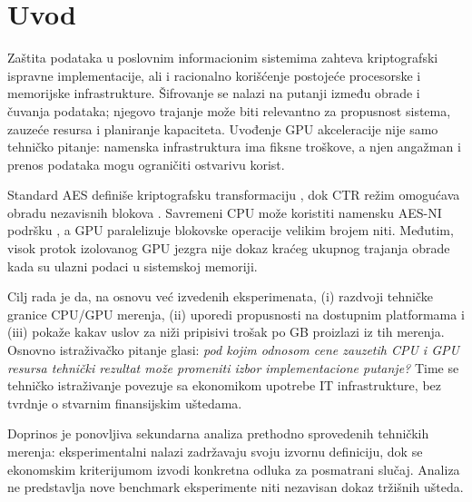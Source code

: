 \documentclass[11pt,b5paper]{article}
\begin{document}
\section{Uvod}
Zaštita podataka u poslovnim informacionim sistemima zahteva kriptografski ispravne implementacije, ali i racionalno korišćenje postojeće procesorske i memorijske infrastrukture. Šifrovanje se nalazi na putanji između obrade i čuvanja podataka; njegovo trajanje može biti relevantno za propusnost sistema, zauzeće resursa i planiranje kapaciteta. Uvođenje GPU akceleracije nije samo tehničko pitanje: namenska infrastruktura ima fiksne troškove, a njen angažman i prenos podataka mogu ograničiti ostvarivu korist.\par
Standard AES definiše kriptografsku transformaciju \citep{nist_aes2023}, dok CTR režim omogućava obradu nezavisnih blokova \citep{nist_ctr2001}. Savremeni CPU može koristiti namensku AES-NI podršku \citep{intel_aesni}, a GPU paralelizuje blokovske operacije velikim brojem niti. Međutim, visok protok izolovanog GPU jezgra nije dokaz kraćeg ukupnog trajanja obrade kada su ulazni podaci u sistemskoj memoriji.\par
Cilj rada je da, na osnovu već izvedenih eksperimenata, (i) razdvoji tehničke granice CPU/GPU merenja, (ii) uporedi propusnosti na dostupnim platformama i (iii) pokaže kakav uslov za niži pripisivi trošak po GB proizlazi iz tih merenja. Osnovno istraživačko pitanje glasi: \emph{pod kojim odnosom cene zauzetih CPU i GPU resursa tehnički rezultat može promeniti izbor implementacione putanje?} Time se tehničko istraživanje povezuje sa ekonomikom upotrebe IT infrastrukture, bez tvrdnje o stvarnim finansijskim uštedama.\par
Doprinos je ponovljiva sekundarna analiza prethodno sprovedenih tehničkih merenja: eksperimentalni nalazi zadržavaju svoju izvornu definiciju, dok se ekonomskim kriterijumom izvodi konkretna odluka za posmatrani slučaj. Analiza ne predstavlja nove benchmark eksperimente niti nezavisan dokaz tržišnih ušteda.
\end{document}
